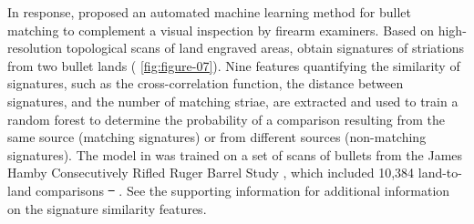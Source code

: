 \documentclass[AMS,STIX2COL]{WileyNJD-v2}\usepackage[]{graphicx}\usepackage[]{color}
\providecommand{\DIFadd}[1]{{\protect\color{blue}\uwave{#1}}} %
\providecommand{\DIFdel}[1]{{\protect\color{red}\sout{#1}}}                      %
\providecommand{\DIFaddbegin}{} %
\providecommand{\DIFaddend}{} %
\providecommand{\DIFdelbegin}{} %
\providecommand{\DIFdelend}{} %
\newcommand{\DIFscaledelfig}{0.5}
\newlength{\DIFdelgraphicswidth} %
\newlength{\DIFdelgraphicsheight} %
\newcommand{\DIFaddincludegraphics}[2][]{{\color{blue}\fbox{\DIFOincludegraphics[#1]{#2}}}} %
\newcommand{\DIFdelincludegraphics}[2][]{%
\sbox{\DIFdelgraphicsbox}{\DIFOincludegraphics[#1]{#2}}%
\settoboxwidth{\DIFdelgraphicswidth}{\DIFdelgraphicsbox} %
\settoboxtotalheight{\DIFdelgraphicsheight}{\DIFdelgraphicsbox} %
\scalebox{\DIFscaledelfig}{%
\parbox[b]{\DIFdelgraphicswidth}{\usebox{\DIFdelgraphicsbox}\\[-\baselineskip] \rule{\DIFdelgraphicswidth}{0em}}\llap{\resizebox{\DIFdelgraphicswidth}{\DIFdelgraphicsheight}{%
\setlength{\unitlength}{\DIFdelgraphicswidth}%
\begin{picture}(1,1)%
\thicklines\linethickness{2pt} %
{\color[rgb]{1,0,0}\put(0,0){\framebox(1,1){}}}%
{\color[rgb]{1,0,0}\put(0,0){\line( 1,1){1}}}%
{\color[rgb]{1,0,0}\put(0,1){\line(1,-1){1}}}%
\end{picture}%
}\hspace*{3pt}}} %
} %
\DeclareRobustCommand{\DIFaddbegin}{\DIFOaddbegin \let\includegraphics\DIFaddincludegraphics} %
\DeclareRobustCommand{\DIFaddend}{\DIFOaddend \let\includegraphics\DIFOincludegraphics} %
\DeclareRobustCommand{\DIFdelbegin}{\DIFOdelbegin \let\includegraphics\DIFdelincludegraphics} %
\DeclareRobustCommand{\DIFdelend}{\DIFOaddend \let\includegraphics\DIFOincludegraphics} %
\begin{document}
In response, \citet{hare:2017} proposed an automated machine learning method for bullet matching to complement a visual inspection by firearm examiners. Based on high-resolution topological scans of land engraved areas, \citet{hare:2017} obtain signatures of striations from two bullet lands (\DIFdelbegin %
\DIFdelend \DIFaddbegin \autoref{fig:figure-07}\DIFaddend ). Nine features quantifying the similarity of signatures, such as the cross-correlation function, the distance between signatures, and the number of matching striae, are extracted and used to train a random forest to determine the probability of a comparison resulting from the same source (matching signatures) or from different sources (non-matching signatures). The model in \citet{hare:2017} was trained on a set of scans of bullets from the James Hamby Consecutively Rifled Ruger Barrel Study \citep{hamby:2009}, which included 10,384 land-to-land comparisons \DIFdelbegin \DIFdel{\mbox{%
\citet{hare:2017}}\hspace{0pt}%
}\DIFdelend \DIFaddbegin \DIFadd{\mbox{%
\citep{hare:2017}}\hspace{0pt}%
}\DIFaddend . See the supporting information for additional information on the signature similarity features.
\end{document}
